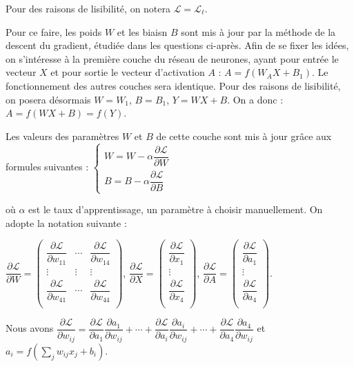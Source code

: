  Pour des raisons de lisibilité, on notera $\mathcal{L} = \mathcal{L}_{\ell}$.

Pour ce faire, les poids $W$ et les biaisn $B$ sont mis à jour par la méthode de la descent du gradient, étudiée dans les questions ci-après. Afin de se fixer les idées, on s'intéresse à la première couche du réseau de neurones, ayant pour entrée le vecteur $X$ et pour sortie le vecteur d'activation $A$ : $A=f\left(W_A X + B_1\right)$. Le fonctionnement des autres couches sera identique. Pour des raisons de lisibilité, on posera désormais $W=W_1$, $B=B_1$, $Y=WX+B$. On a donc : $A = f\left(WX + B\right) = f\left(Y\right)$.

Les valeurs des paramètres $W$ et $B$ de cette couche sont mis à jour grâce aux formules suivantes : 
$\left\{
\begin{array}{l}
W = W -\alpha \dfrac{\partial \mathcal{L}}{\partial W} \\
B = B -\alpha \dfrac{\partial \mathcal{L}}{\partial B}
\end{array}
\right.$

où $\alpha$ est le taux d'apprentissage, un paramètre à choisir manuellement. On adopte la notation suivante :

$ \dfrac{\partial \mathcal{L}}{\partial W} =
\begin{pmatrix}
\dfrac{\partial \mathcal{L}}{\partial w_{11}} & \cdots & \dfrac{\partial \mathcal{L}}{\partial w_{14}} \\
\vdots & \vdots & \vdots \\
\dfrac{\partial \mathcal{L}}{\partial w_{41}} & \cdots & \dfrac{\partial \mathcal{L}}{\partial w_{44}} \\
\end{pmatrix}
$, 
$ \dfrac{\partial \mathcal{L}}{\partial X} =
\begin{pmatrix}
\dfrac{\partial \mathcal{L}}{\partial x_{1}} \\
\vdots \\
\dfrac{\partial \mathcal{L}}{\partial x_{4}} \\
\end{pmatrix}
$, 
$ \dfrac{\partial \mathcal{L}}{\partial A} =
\begin{pmatrix}
\dfrac{\partial \mathcal{L}}{\partial a_{1}} \\
\vdots \\
\dfrac{\partial \mathcal{L}}{\partial a_{4}} \\
\end{pmatrix}
$.

Nous avons 
$\dfrac{\partial \mathcal{L}}{\partial w_{ij}}
=
\dfrac{\partial \mathcal{L}}{\partial a_1} \dfrac{\partial a_1}{\partial w_{ij}}+ \cdots +
\dfrac{\partial \mathcal{L}}{\partial a_i}  \dfrac{\partial a_i}{\partial w_{ij}}+ \cdots +
\dfrac{\partial \mathcal{L}}{\partial a_4} \dfrac{\partial a_4}{\partial w_{ij}}
$ et $a_i = f\left(\sum\limits_{j} w_{ij}x_j + b_i\right)$.

